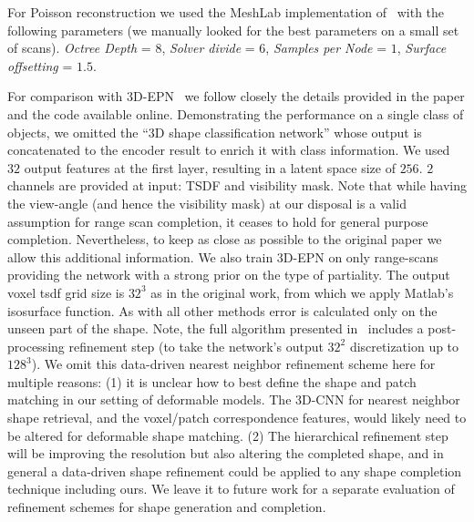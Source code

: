 For Poisson reconstruction we used the MeshLab implementation of~\cite{kazhdan2013screened} with the following parameters (we manually looked for the best parameters on a small set of scans). \textit{Octree Depth} = $8$, \textit{Solver divide} = $6$, \textit{Samples per Node} = $1$, \textit{Surface offsetting} = $1.5$. %

For comparison with 3D-EPN~\cite{dai2016shape} we follow closely the details provided in the paper and the code available online. Demonstrating the performance on a single class of objects, we omitted the ``3D shape classification network'' whose output is concatenated to the encoder result to enrich it with class information. We used $32$ output features at the first layer, resulting in a latent space size of $256$. $2$ channels are provided at input: TSDF and visibility mask. Note that while having the view-angle (and hence the visibility mask) at our disposal is a valid assumption for range scan completion, it ceases to hold for general purpose completion. Nevertheless, to keep as close as possible to the original paper we allow this additional information. We also train 3D-EPN on only range-scans providing the network with a strong prior on the type of partiality. The output voxel tsdf grid size is $32^3$ as in the original work, from which we apply Matlab's isosurface function. As with all other methods error is calculated only on the unseen part of the shape. Note, the full algorithm presented in~\cite{dai2016shape} includes a post-processing refinement step (to take the network's output $32^2$ discretization up to $128^3$). We omit this data-driven nearest neighbor refinement scheme here for multiple reasons: (1) it is unclear how to best define the shape and patch matching in our setting of deformable models. The 3D-CNN for nearest neighbor shape retrieval, and the voxel/patch correspondence features, would likely need to be altered for deformable shape matching. (2) The hierarchical refinement step will be improving the resolution but also altering the completed shape, and in general a data-driven shape refinement could be applied to any shape completion technique including ours. We leave it to future work for a separate evaluation of refinement schemes for shape generation and completion. 

